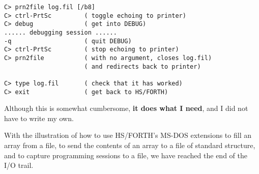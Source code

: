 \begin{lstlisting}
C> prn2file log.fil [/b8]
C> ctrl-PrtSc         ( toggle echoing to printer)
C> debug              ( get into DEBUG)
...... debugging session ......
-q                    ( quit DEBUG)
C> ctrl-PrtSc         ( stop echoing to printer)
C> prn2file           ( with no argument, closes log.fil)
                      ( and redirects back to printer)

C> type log.fil       ( check that it has worked)
C> exit               ( get back to HS/FORTH)
\end{lstlisting}

Although this is somewhat cumbersome, \textbf{it does what I need}, and I did not have to write my own.

With the illustration of how to use HS/FORTH's MS-DOS extensions to fill an array from a file, to send the contents of an array to a file of standard structure, and to capture programming sessions to a file, we have reached the end of the I/O trail.